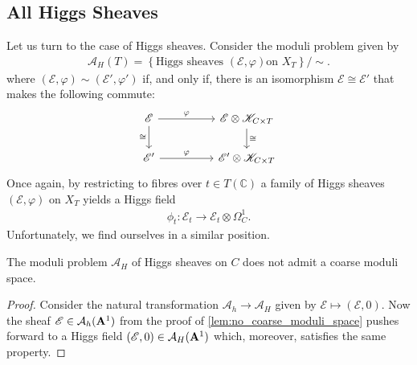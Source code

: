 \documentclass[12pt]{ociamthesis}  %
\begin{document}
\subsection{All Higgs Sheaves}

Let us turn to the case of Higgs sheaves. Consider the moduli problem
given by 
\begin{align*}
  \mathcal A_H(T) = \left\lbrace{\text{Higgs sheaves $(\mathscr E,\varphi)$
      on $X_T$}}\right\rbrace/\sim.
\end{align*}
where $(\mathscr E,\varphi)\sim(\mathscr E',\varphi')$ if, and only if,
there is an isomorphism $\mathscr E\cong\mathscr E'$ that makes the
following commute:
\begin{equation*}
  \begin{tikzcd}
    {\mathscr E} && {\mathscr E\otimes \mathscr K_{C\times T}} \\
    {\mathscr E'} && {\mathscr E'\otimes\mathscr K_{C\times T}}
    \arrow["\varphi", from=1-1, to=1-3]
    \arrow["\cong"', from=1-1, to=2-1]
    \arrow["\cong", from=1-3, to=2-3]
    \arrow["\varphi", from=2-1, to=2-3]
  \end{tikzcd}
\end{equation*}
Once again, by restricting to fibres over $t\in T(\mathbb{C})$
a family of Higgs sheaves $(\mathscr E,\varphi)$ on $X_T$ yields
a Higgs field
\begin{align*}
  \phi_t : \mathscr E_t \to \mathscr E_t \otimes \Omega^1_C.
\end{align*}
Unfortunately, we find ourselves in a similar position.
\begin{corollary}
  The moduli problem $\mathcal A_H$ of Higgs sheaves on $C$ does not admit
  a coarse moduli space.
  \begin{proof}
    Consider the natural transformation $\mathcal A_h\to\mathcal A_H$
    given by $\mathscr E \mapsto (\mathscr E,0)$. Now the sheaf
    $\mathscr E\in\mathcal A_h(\mathbf{A}^{1}_{})$ from the proof of
    \ref{lem:no_coarse_moduli_space} pushes forward to a Higgs field
    $(\mathscr E,0)\in\mathcal A_H(\mathbf{A}^{1}_{})$ which, moreover,
    satisfies the same property.
  \end{proof}
\end{corollary}
\end{document}
